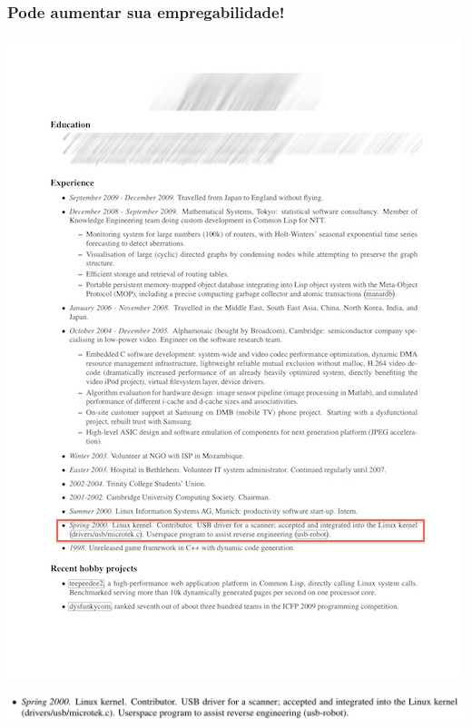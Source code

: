 \documentclass[xcolor=dvipsnames]{beamer}
\begin{document}
\begin{frame}
	\frametitle{Pode aumentar sua empregabilidade!}
 	\includegraphics[scale=0.75]{example_CV2.jpg}
\end{frame}

\begin{frame}
 	\includegraphics[scale=0.30]{contrib.jpg}
\end{frame}
\end{document}
